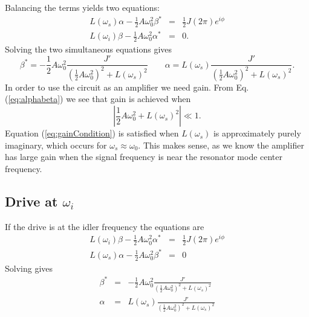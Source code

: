 Balancing the terms yields two equations: \begin{eqnarray}
L(\omega_s)\alpha - \frac{1}{2}A\omega_0^2 \beta^* &=& \frac{1}{2}J(2\pi)e^{i\phi} \\
L(\omega_i)\beta - \frac{1}{2}A\omega_0^2 \alpha^* &=& 0 . \end{eqnarray}
Solving the two simultaneous equations gives
\begin{equation}
\beta^* = - \frac{1}{2}A\omega_0^2 \frac{J'}{\left(\frac{1}{2}A\omega_0^2 \right)^2 + L(\omega_s)^2} \qquad
\alpha = L(\omega_s) \frac{J'}{\left(\frac{1}{2}A\omega_0^2 \right)^2 + L(\omega_s)^2} . \label{eq:alphabeta}
\end{equation}
In order to use the circuit as an amplifier we need gain.
From Eq. (\ref{eq:alphabeta}) we see that gain is achieved when
\begin{equation}
\left| \frac{1}{2}A\omega_0^2 + L(\omega_s)^2 \right| \ll 1 . \label{eq:gainCondition} \end{equation}
Equation (\ref{eq:gainCondition}) is satisfied when $L(\omega_s)$ is approximately purely imaginary, which occurs for $\omega_s \approx \omega_0$.
This makes sense, as we know the amplifier has large gain when the signal frequency is near the resonator mode center frequency.

\subsection{Drive at $\omega_i$}
If the drive is at the idler frequency the equations are \begin{eqnarray}
L(\omega_i)\beta - \frac{1}{2}A\omega_0^2 \alpha^* &=& \frac{1}{2}J(2\pi)e^{i\phi} \\
L(\omega_s)\alpha - \frac{1}{2}A\omega_0^2 \beta^* &=& 0 \end{eqnarray}
Solving gives \begin{eqnarray}
\beta^* &=& -\frac{1}{2}A\omega_0^2 \frac{J'}{\left( \frac{1}{2}A\omega_0^2 \right)^2 + L(\omega_s)^2} \\
\alpha &=& L(\omega_s) \frac{J'}{\left( \frac{1}{2}A\omega_0^2 \right)^2 + L(\omega_s)^2} \end{eqnarray}
